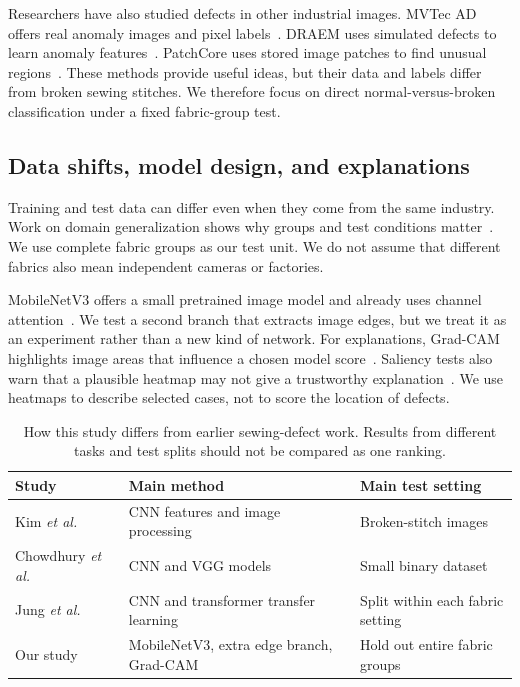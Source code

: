 \documentclass[conference,a4paper]{IEEEtran}
\begin{document}
Researchers have also studied defects in other industrial images. MVTec AD offers real anomaly images and pixel labels~\cite{bergmann2019}. DRAEM uses simulated defects to learn anomaly features~\cite{draem2021}. PatchCore uses stored image patches to find unusual regions~\cite{roth2022}. These methods provide useful ideas, but their data and labels differ from broken sewing stitches. We therefore focus on direct normal-versus-broken classification under a fixed fabric-group test.

\subsection{Data shifts, model design, and explanations}
Training and test data can differ even when they come from the same industry. Work on domain generalization shows why groups and test conditions matter~\cite{zhou2023,koh2021,gulrajani2021,sagawa2020}. We use complete fabric groups as our test unit. We do not assume that different fabrics also mean independent cameras or factories.

MobileNetV3 offers a small pretrained image model and already uses channel attention~\cite{howard2019,hu2018}. We test a second branch that extracts image edges, but we treat it as an experiment rather than a new kind of network. For explanations, Grad-CAM highlights image areas that influence a chosen model score~\cite{selvaraju2017}. Saliency tests also warn that a plausible heatmap may not give a trustworthy explanation~\cite{adebayo2018}. We use heatmaps to describe selected cases, not to score the location of defects.

\begin{table}[!t]\centering
\caption{How this study differs from earlier sewing-defect work. Results from different tasks and test splits should not be compared as one ranking.}\label{tab:prior}
\footnotesize\setlength{\tabcolsep}{3.2pt}
\begin{tabular}{p{}p{}p{}}\toprule
Study & Main method & Main test setting\\\midrule
Kim \emph{et al.}~\cite{kim2022} & CNN features and image processing & Broken-stitch images\\
Chowdhury \emph{et al.}~\cite{chowdhury2024} & CNN and VGG models & Small binary dataset\\
Jung \emph{et al.}~\cite{jung2025} & CNN and transformer transfer learning & Split within each fabric setting\\
Our study & MobileNetV3, extra edge branch, Grad-CAM & Hold out entire fabric groups\\\bottomrule
\end{tabular}
\end{table}
\end{document}
